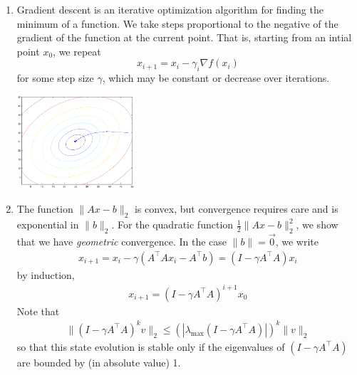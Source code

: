 \documentclass[10pt]{article}
\begin{document}
\begin{multicols}{2}
\begin{addmargin}[0.8em]{0.5em}
    \begin{enumerate}[label=(\alph*)]
        \item Gradient descent is an iterative optimization algorithm for finding the minimum of a function. We take steps proportional to the negative of the gradient of the function at the current point. That is, starting from an intial point $x_0$, we repeat
        $$x_{i+1} = x_i - \gamma_i \nabla f(x_i)$$
        for some step size $\gamma$, which may be constant or decrease over iterations.
        \vspace{-0.2cm}
        \begin{center}
            \includegraphics[width=4.4cm]{gd.png}
        \end{center}
        \vspace{-0.4cm}
        
        \item The function $\| Ax - b \|_2$ is convex, but convergence requires care and is exponential in $\|b\|_2$. For the quadratic function $\frac{1}{2} \| Ax - b\|_2^2$, we show that we have \textit{geometric} convergence. In the case $\|b\|=\vec{0}$, we write
        \begin{align*}
        x_{i+1} = x_i - \gamma (A^\top A x_i - A^\top b) = (I - \gamma A^\top A)x_i
        \end{align*}
        by induction,
        \begin{align*}
        x_{i+1} = (I - \gamma A^\top A)^{i+1}x_0
        \end{align*}
        Note that 
        \begin{align*}
        \| (I - \gamma A^\top A)^{k}v \|_2 \leq (| \lambda_{\text{max}}(I - \gamma A^\top A) |)^k \|v\|_2
        \end{align*}
        so that this state evolution is stable only if the eigenvalues of $(I - \gamma A^\top A)$ are bounded by (in absolute value) 1.
        

\end{enumerate}
\end{addmargin}
\end{multicols}
\end{document}
